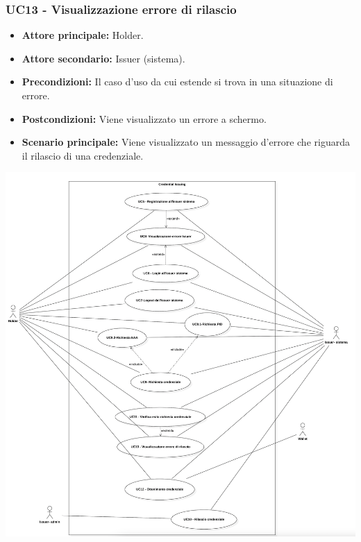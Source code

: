 \subsubsection{UC13 - Visualizzazione errore di rilascio}
\begin{itemize}
    \item \textbf{Attore principale:} Holder.
    \item  \textbf{Attore secondario:} Issuer (sistema).
    \item \textbf{Precondizioni:} Il caso d'uso da cui estende si trova in una situazione di errore.
    \item \textbf{Postcondizioni:} Viene visualizzato un errore a schermo. 
    \item \textbf{Scenario principale:} Viene visualizzato un messaggio d’errore che riguarda il rilascio di una credenziale.
\end{itemize}

\begin{center}
    \includegraphics[scale = 0.4]{./res/img/UC2.PNG}
\end{center}


